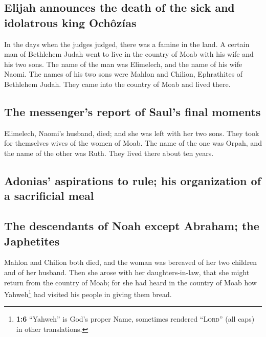 \hypertarget{elijah-announces-the-death-of-the-sick-and-idolatrous-king-ochuxf4zuxedas}{%
\subsection{Elijah announces the death of the sick and idolatrous king
Ochôzías}\label{elijah-announces-the-death-of-the-sick-and-idolatrous-king-ochuxf4zuxedas}}

 In the days when the judges judged, there was a famine in
the land. A certain man of Bethlehem Judah went to live in the country
of Moab with his wife and his two sons.  The name of the
man was Elimelech, and the name of his wife Naomi. The names of his two
sons were Mahlon and Chilion, Ephrathites of Bethlehem Judah. They came
into the country of Moab and lived there.

\hypertarget{the-messengers-report-of-sauls-final-moments}{%
\subsection{The messenger's report of Saul's final
moments}\label{the-messengers-report-of-sauls-final-moments}}

 Elimelech, Naomi's husband, died; and she was left with
her two sons.  They took for themselves wives of the women
of Moab. The name of the one was Orpah, and the name of the other was
Ruth. They lived there about ten years.

\hypertarget{adonias-aspirations-to-rule-his-organization-of-a-sacrificial-meal}{%
\subsection{Adonias' aspirations to rule; his organization of a
sacrificial
meal}\label{adonias-aspirations-to-rule-his-organization-of-a-sacrificial-meal}}

\hypertarget{the-descendants-of-noah-except-abraham-the-japhetites}{%
\subsection{The descendants of Noah except Abraham; the
Japhetites}\label{the-descendants-of-noah-except-abraham-the-japhetites}}

 Mahlon and Chilion both died, and the woman was bereaved
of her two children and of her husband.  Then she arose
with her daughters-in-law, that she might return from the country of
Moab; for she had heard in the country of Moab how Yahweh\footnote{\textbf{1:6}
  ``Yahweh'' is God's proper Name, sometimes rendered ``\textsc{Lord}''
  (all caps) in other translations.} had visited his people in giving
them bread.

